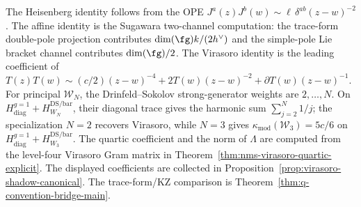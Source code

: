 \begin{remark}
The Heisenberg identity follows from the OPE
$J^a(z)J^b(w)\sim \ell\,\delta^{ab}(z-w)^{-2}$. The affine identity is
the Sugawara two-channel computation: the trace-form double-pole
projection contributes $\dim(\fg)k/(2h^\vee)$ and the simple-pole Lie
bracket channel contributes $\dim(\fg)/2$. The Virasoro identity is
the leading coefficient of
$T(z)T(w)\sim (c/2)(z-w)^{-4}+2T(w)(z-w)^{-2}+\partial T(w)(z-w)^{-1}$.
For principal $\mathcal W_N$, the Drinfeld--Sokolov strong-generator
weights are $2,\ldots,N$.  On
$H_{\mathrm{diag}}^{g=1}+H_{W_N}^{\mathrm{DS/bar}}$, their diagonal
trace gives the harmonic sum $\sum_{j=2}^{N}1/j$; the specialization
$N=2$ recovers Virasoro, while $N=3$ gives
\(\kappa_{\mathrm{mod}}(\mathcal W_3)=5c/6\) on
$H_{\mathrm{diag}}^{g=1}+H_{W_3}^{\mathrm{DS/bar}}$.
The quartic coefficient and the norm of \(\Lambda\) are computed from
the level-four Virasoro Gram matrix in
Theorem~\ref{thm:nms-virasoro-quartic-explicit}.  The displayed
coefficients are collected in
Proposition~\ref{prop:virasoro-shadow-canonical}.  The trace-form/KZ
comparison is Theorem~\ref{thm:q-convention-bridge-main}.
\end{remark}

